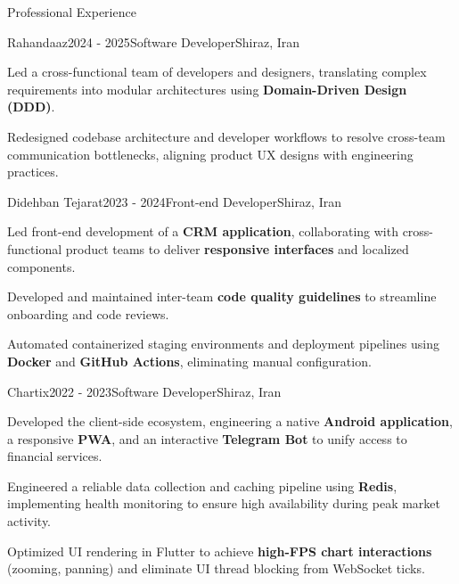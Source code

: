 \documentclass[
	a4paper, %
	12pt, %
]{resume} %
\begin{document}
\begin{rSection}{Professional Experience}
\hypertarget{experience}{}
    \begin{rSubsection}{Rahandaaz}{2024 - 2025}{Software Developer}{Shiraz, Iran}
		\item Led a cross-functional team of developers and designers, translating complex requirements into modular architectures using \textbf{Domain-Driven Design (DDD)}.
		\item Redesigned codebase architecture and developer workflows to resolve cross-team communication bottlenecks, aligning product UX designs with engineering practices.
        \\       
	\end{rSubsection}

	\begin{rSubsection}{Didehban Tejarat}{2023 - 2024}{Front-end Developer}{Shiraz, Iran}
		\item Led front-end development of a \textbf{CRM application}, collaborating with cross-functional product teams to deliver \textbf{responsive interfaces} and localized components.
		\item Developed and maintained inter-team \textbf{code quality guidelines} to streamline onboarding and code reviews.
		\item Automated containerized staging environments and deployment pipelines using \textbf{Docker} and \textbf{GitHub Actions}, eliminating manual configuration.
        \\      
	\end{rSubsection}

	\begin{rSubsection}{Chartix}{2022 - 2023}{Software Developer}{Shiraz, Iran}
		\item Developed the client-side ecosystem, engineering a native \textbf{Android application}, a responsive \textbf{PWA}, and an interactive \textbf{Telegram Bot} to unify access to financial services.
		\item Engineered a reliable data collection and caching pipeline using \textbf{Redis}, implementing health monitoring to ensure high availability during peak market activity.
		\item Optimized UI rendering in Flutter to achieve \textbf{high-FPS chart interactions} (zooming, panning) and eliminate UI thread blocking from WebSocket ticks.
        \\      
	\end{rSubsection}


\end{rSection}
\end{document}
